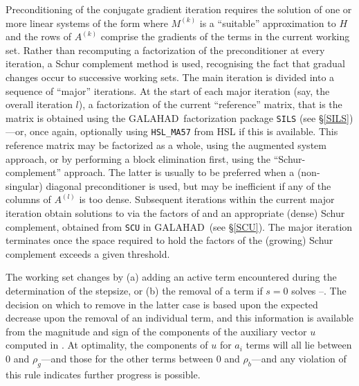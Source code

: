 \documentclass[twoside]{article}
\newcommand{\gal}{{\sf GALAHAD}}
\begin{document}
Preconditioning of the conjugate gradient iteration
requires the solution of one or more linear systems of the form
where $M^{(k)}$ is a ``suitable'' approximation to $H$
and the rows of $A^{(k)}$ comprise the gradients of the
terms in the current working set. Rather than recomputing a
factorization of the preconditioner at every iteration, a
Schur complement method is used, recognising the fact that
gradual changes occur to successive working sets. The main
iteration is divided into a sequence of ``major'' iterations.
At the start of each major iteration (say, the overall iteration $l$),
a factorization of the
current ``reference'' matrix, that is the matrix
is obtained using  the \gal\ factorization package
{\tt SILS} (see \S\ref{SILS})---or, once again,
optionally using {\tt HSL\_MA57} from HSL if this is available.
This reference matrix may be factorized as a whole, using the
augmented system approach, or by performing a block elimination first, using
the ``Schur-complement'' approach. The latter is usually to be preferred
when a (non-singular) diagonal
preconditioner is used, but may be inefficient if any of the columns
of $A^{(l)}$ is too dense.
Subsequent iterations within the current major
iteration obtain solutions to  via the factors of 
and an appropriate (dense) Schur complement,
obtained from {\tt SCU} in \gal\ (see \S\ref{SCU}).
The major iteration terminates
once the space required to hold the factors of the (growing) Schur
complement exceeds a given threshold.

The working set changes by (a) adding an active term encountered during
the determination of the stepsize, or (b) the removal of a term if $s = 0$
solves --. The  decision on which to remove in the latter
case is based upon the expected decrease upon the removal of an individual term,
and this information is available from the magnitude and sign of the components
of the auxiliary vector $u$ computed in . At optimality, the
components of $u$ for $a_i$ terms will all lie between
$0$ and $\rho_g$---and those for the other terms
between $0$ and $\rho_b$---and any violation
of this rule indicates further progress is possible.
\end{document}

